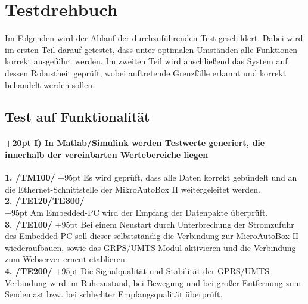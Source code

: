 \documentclass[fontsize = 12pt, paper = a4]{scrreprt}
\begin{document}
\chapter{Testdrehbuch}

Im Folgenden wird der Ablauf der durchzuführenden Test geschildert. Dabei wird im ersten Teil darauf getestet, dass unter optimalen Umständen alle Funktionen korrekt ausgeführt werden. Im zweiten Teil wird anschließend das System auf dessen Robustheit geprüft, wobei auftretende Grenzfälle erkannt und korrekt behandelt werden sollen.


\section{Test auf Funktionalität}
\subsubsection*{
\hangindent+20pt 
I) In Matlab/Simulink werden Testwerte generiert, die innerhalb der vereinbarten Wertebereiche liegen \\}

\vspace*{3mm}

\textbf{1. /TM100/}
\hangindent+95pt 
\hspace*{5.5mm} 
Es wird geprüft, dass alle Daten korrekt gebündelt und an die Ethernet-Schnittstelle der MikroAutoBox II weitergeleitet werden. \\

\textbf{2. /TE120/TE300/}\\
\hangindent+95pt 
Am Embedded-PC wird der Empfang der Datenpakte überprüft.\\

\textbf{3. /TE100/}
\hangindent+95pt 
\hspace*{8mm} 
Bei einem Neustart durch Unterbrechung der Stromzufuhr des Embedded-PC soll dieser selbstständig die Verbindung zur MicroAutoBox II wiederaufbauen, sowie das GRPS/UMTS-Modul aktivieren und die Verbindung zum Webserver erneut etablieren.\\

\textbf{4. /TE200/}
\hangindent+95pt 
\hspace*{8mm} 
Die Signalqualität und Stabilität der GPRS/UMTS-Verbindung wird im Ruhezustand, bei Bewegung und bei großer Entfernung zum Sendemast bzw. bei schlechter Empfangsqualität überprüft.\\
\end{document}
